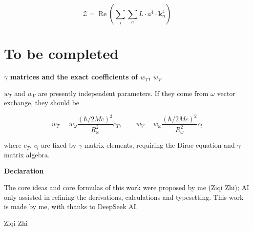 \documentclass[UTF8]{article}
\begin{document}
\begin{equation}
\mathcal{Z}=\operatorname{Re}\left(\sum_i\sum_n L\cdot a^4\cdot\mathbf{k}^4_n\right)
\end{equation}



\section{To be completed}

\textbf{$\gamma$ matrices and the exact coefficients of $w_T$, $w_V$}

$w_T$ and $w_V$ are presently independent parameters. If they come from $\omega$ vector exchange, they should be

\begin{equation}
w_T=w_{\omega}\frac{(\hbar/2Mc)^2}{R_{\omega}^2}c_T,\qquad
w_V=w_{\omega}\frac{(\hbar/2Mc)^2}{R_{\omega}^2}c_l
\end{equation}

where $c_T$, $c_l$ are fixed by $\gamma$-matrix elements, requiring the Dirac equation and $\gamma$-matrix algebra.


\vspace{2em}
\noindent\textbf{Declaration}

The core ideas and core formulas of this work were proposed by me (Ziqi Zhi); AI only assisted in
refining the derivations, calculations and typesetting. This work is made by me, with thanks to DeepSeek AI.

\vspace{1em}
\noindent Ziqi Zhi
\end{document}
